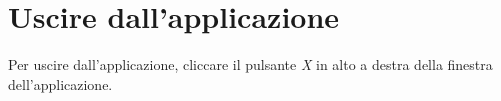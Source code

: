 \section{Uscire dall'applicazione}
Per uscire dall'applicazione, cliccare il pulsante \emph{X} in alto a destra della finestra dell'applicazione.